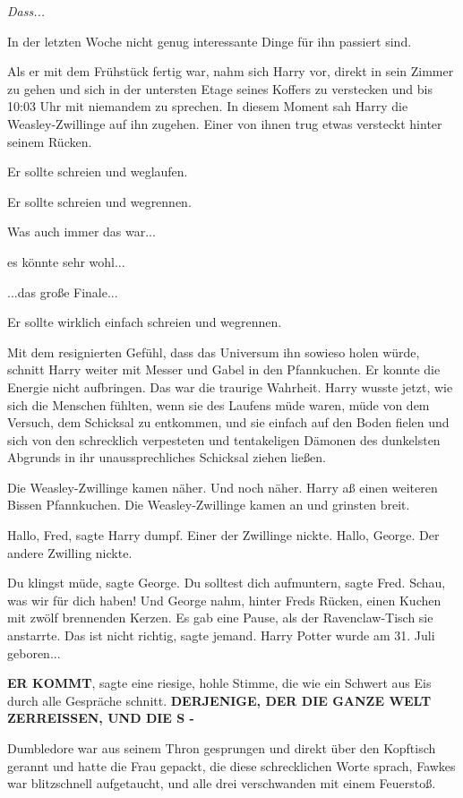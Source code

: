 \emph{Dass...}

In der letzten Woche nicht genug interessante Dinge für ihn passiert sind.

Als er mit dem Frühstück fertig war, nahm sich Harry vor, direkt in sein Zimmer
zu gehen und sich in der untersten Etage seines Koffers zu verstecken und bis
10:03 Uhr mit niemandem zu sprechen. In diesem Moment sah Harry die
Weasley-Zwillinge auf ihn zugehen. Einer von ihnen trug etwas versteckt hinter
seinem Rücken.

Er sollte schreien und weglaufen.

Er sollte schreien und wegrennen.

Was auch immer das war...

es könnte sehr wohl...

...das große Finale...

Er sollte wirklich einfach schreien und wegrennen.

Mit dem resignierten Gefühl, dass das Universum ihn sowieso holen würde, schnitt
Harry weiter mit Messer und Gabel in den Pfannkuchen. Er konnte die Energie
nicht aufbringen. Das war die traurige Wahrheit. Harry wusste jetzt, wie sich
die Menschen fühlten, wenn sie des Laufens müde waren, müde von dem Versuch, dem
Schicksal zu entkommen, und sie einfach auf den Boden fielen und sich von den
schrecklich verpesteten und tentakeligen Dämonen des dunkelsten Abgrunds in ihr
unaussprechliches Schicksal ziehen ließen.

Die Weasley-Zwillinge kamen näher. Und noch näher. Harry aß einen weiteren
Bissen Pfannkuchen. Die Weasley-Zwillinge kamen an und grinsten breit.

\glqq{}Hallo, Fred\grqq{}, sagte Harry dumpf. Einer der Zwillinge nickte. \glqq
Hallo, George.\grqq{} Der andere Zwilling nickte.

\glqq{}Du klingst müde\grqq{}, sagte George. \glqq{}Du solltest dich
aufmuntern\grqq{}, sagte Fred. \glqq{}Schau, was wir für dich haben!\grqq{} Und
George nahm, hinter Freds Rücken, einen Kuchen mit zwölf brennenden Kerzen. Es
gab eine Pause, als der Ravenclaw-Tisch sie anstarrte. \glqq{}Das ist nicht
richtig\grqq{}, sagte jemand. \glqq{}Harry Potter wurde am 31. Juli
geboren...\grqq{}

\textbf{\glqq{}ER KOMMT\grqq{}}, sagte eine riesige, hohle Stimme, die wie ein
Schwert aus Eis durch alle Gespräche schnitt. \textbf{\glqq{}DERJENIGE, DER DIE
GANZE WELT ZERREISSEN, UND DIE S -\grqq{}}

Dumbledore war aus seinem Thron gesprungen und direkt über den Kopftisch gerannt
und hatte die Frau gepackt, die diese schrecklichen Worte sprach, Fawkes war
blitzschnell aufgetaucht, und alle drei verschwanden mit einem Feuerstoß.

